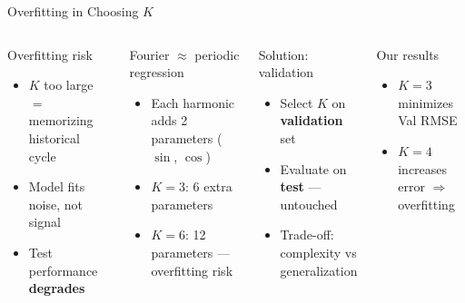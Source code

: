 \documentclass[9pt, aspectratio=169, t]{beamer}
\begin{document}
\begin{frame}{Overfitting in Choosing $K$}
    \begin{columns}[T]
        \begin{alertblock}{Overfitting risk}
            \begin{itemize}\setlength{\itemsep}{0pt}
                \item $K$ too large $=$ memorizing historical cycle
                \item Model fits noise, not signal
                \item Test performance \textbf{degrades}
            \end{itemize}
        \end{alertblock}

        \vspace{0.2cm}

        \begin{block}{Fourier $\approx$ periodic regression}
            \begin{itemize}\setlength{\itemsep}{0pt}
                \item Each harmonic adds 2 parameters ($\sin$, $\cos$)
                \item $K = 3$: 6 extra parameters
                \item $K = 6$: 12 parameters --- overfitting risk
            \end{itemize}
        \end{block}

        \begin{exampleblock}{Solution: validation}
            \begin{itemize}\setlength{\itemsep}{0pt}
                \item Select $K$ on \textbf{validation} set
                \item Evaluate on \textbf{test} --- untouched
                \item Trade-off: complexity vs generalization
            \end{itemize}
        \end{exampleblock}

        \vspace{0.2cm}

        \begin{block}{Our results}
            \begin{itemize}\setlength{\itemsep}{0pt}
                \item $K = 3$ minimizes Val RMSE
                \item $K = 4$ increases error $\Rightarrow$ overfitting
            \end{itemize}
        \end{block}
    \end{columns}
\end{frame}
\end{document}
